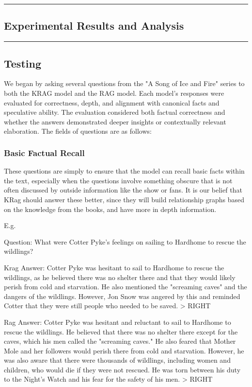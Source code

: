 {\color{gray}\hrule}
\begin{center}
\section{Experimental Results and Analysis}
\bigskip
\end{center}
{\color{gray}\hrule}

\subsection{Testing}
We began by asking several questions from the "A Song of Ice and Fire" series to both the KRAG model and the RAG model. Each model’s responses were evaluated for correctness, depth, and alignment with canonical facts and speculative ability. The evaluation considered both factual correctness and whether the answers demonstrated deeper insights or contextually relevant elaboration. The fields of questions are as follows:  
\subsubsection{Basic Factual Recall}
These questions are simply to ensure that the model can recall basic facts within the text, especially when the questions involve something obscure that is not often discussed by outside information like the show or fans. It is our belief that KRag should answer these better, since they will build relationship graphs based on the knowledge from the books, and have more in depth information. \par
E.g. \par
Question: What were Cotter Pyke's feelings on sailing to Hardhome to rescue the wildlings?\par
Krag Answer:  Cotter Pyke was hesitant to sail to Hardhome to rescue the wildlings, as he believed there was no shelter there and that they would likely perish from cold and starvation. He also mentioned the "screaming caves" and the dangers of the wildlings. However, Jon Snow was angered by this and reminded Cotter that they were still people who needed to be saved.
> RIGHT

Rag Answer:  Cotter Pyke was hesitant and reluctant to sail to Hardhome to rescue the wildlings. He believed that there was no shelter there except for the caves, which his men called the "screaming caves." He also feared that Mother Mole and her followers would perish there from cold and starvation. However, he was also aware that there were thousands of wildlings, including women and children, who would die if they were not rescued. He was torn between his duty to the Night's Watch and his fear for the safety of his men.
> RIGHT

